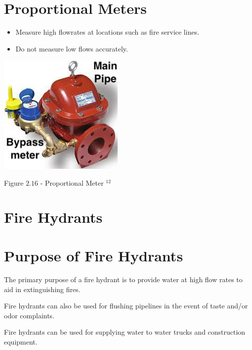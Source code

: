 \documentclass[10pt]{article}
\begin{document}
\section{Proportional Meters}
\begin{itemize}
  \item Measure high flowrates at locations such as fire service lines.

  \item Do not measure low flows accurately.

\end{itemize}
\includegraphics[max width=\textwidth]{ProportionalMeter}

Figure $2.16$ - Proportional Meter ${ }^{12}$

\section{Fire Hydrants}
\section{Purpose of Fire Hydrants}
The primary purpose of a fire hydrant is to provide water at high flow rates to aid in extinguishing fires.

Fire hydrants can also be used for flushing pipelines in the event of taste and/or odor complaints.

Fire hydrants can be used for supplying water to water trucks and construction equipment.
\end{document}
